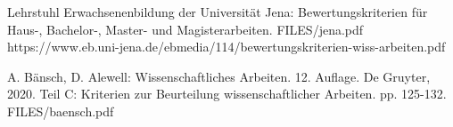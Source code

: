 {Lehrstuhl Erwachsenenbildung der Universität Jena: 
Bewertungskriterien für Haus-, Bachelor-, Master- und Magisterarbeiten.\newline}
{FILES/jena.pdf}
{https://www.eb.uni-jena.de/ebmedia/114/bewertungskriterien-wiss-arbeiten.pdf}


{A. Bänsch, D. Alewell: Wissenschaftliches Arbeiten. 12. Auflage. De Gruyter, 2020.
Teil C: Kriterien zur Beurteilung wissenschaftlicher Arbeiten.
pp. 125-132.
}
{FILES/baensch.pdf}
{}












